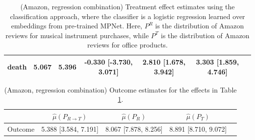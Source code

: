 \documentclass{article}
\begin{document}
\begin{table}[!ht]
\begin{tabular}{c|cccccc}
    death       &              5.067 &              5.396 & -0.330 [-3.730, 3.071]           & 2.810 [1.678, 3.942] & 3.303 [1.859, 4.746]  \\
\bottomrule
    \end{tabular}
    \caption{(Amazon, regression combination) Treatment effect estimates using the classification approach, where the classifier is a logistic regression learned over embeddings from pre-trained MPNet. Here, $P^R$ is the distribution of Amazon reviews for musical instrument purchases, while $P^T$ is the distribution of Amazon reviews for office products.}
    \label{tab:results_clf_mpnet_amazon_synthetic_predreg}
\end{table}

\begin{table}[!ht]
    \centering
    \begin{tabular}{c|cccc}
\toprule
    & $\hat{\mu}(P_{R \rightarrow T})$   & $\hat{\mu}(P_R)$     & $\hat{\mu}(P_T)$     \\
\midrule
    Outcome & 5.388 [3.584, 7.191]               & 8.067 [7.878, 8.256] & 8.891 [8.710, 9.072] \\
\bottomrule
    \end{tabular}
    \caption{(Amazon, regression combination) Outcome estimates for the effects in Table \ref{tab:results_clf_mpnet_amazon_synthetic_predreg}.}
    \label{tab:results_clf_mpnet_amazon_synthetic_predreg_outcome}
\end{table}
\end{document}

